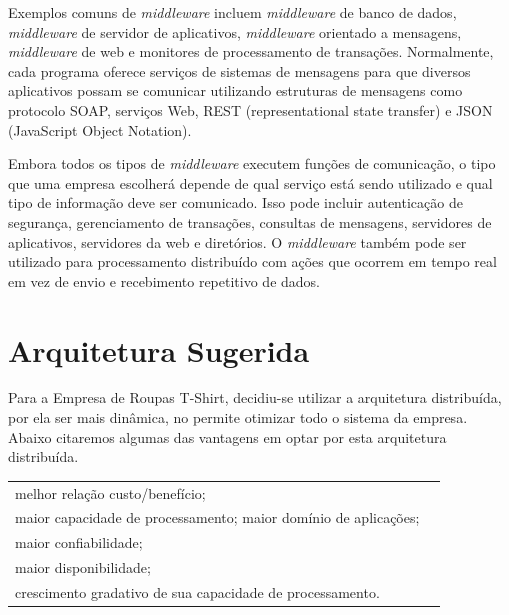 Exemplos comuns de \textit{middleware} incluem \textit{middleware} de banco de dados, \textit{middleware} de servidor de aplicativos, \textit{middleware} orientado a mensagens, \textit{middleware} de web e monitores de processamento de transações. Normalmente, cada programa oferece serviços de sistemas de mensagens para que diversos aplicativos possam se comunicar utilizando estruturas de mensagens como protocolo SOAP, serviços Web, REST (representational state transfer) e JSON (JavaScript Object Notation).

Embora todos os tipos de \textit{middleware} executem funções de comunicação, o tipo que uma empresa escolherá depende de qual serviço está sendo utilizado e qual tipo de informação deve ser comunicado. Isso pode incluir autenticação de segurança, gerenciamento de transações, consultas de mensagens, servidores de aplicativos, servidores da web e diretórios. O \textit{middleware} também pode ser utilizado para processamento distribuído com ações que ocorrem em tempo real em vez de envio e recebimento repetitivo de dados.

\section{Arquitetura Sugerida}

Para a Empresa de Roupas T-Shirt, decidiu-se utilizar a arquitetura distribuída, por ela ser mais dinâmica, no permite otimizar todo o sistema da empresa. Abaixo citaremos algumas das vantagens em optar por esta arquitetura distribuída.

\begin{tabular}{@{$\bullet$ }ll}
	melhor relação custo/benefício; \\
	maior capacidade de processamento; maior domínio de aplicações; \\
	maior confiabilidade; \\
	maior disponibilidade; \\
	crescimento gradativo de sua capacidade de processamento.
\end{tabular}

